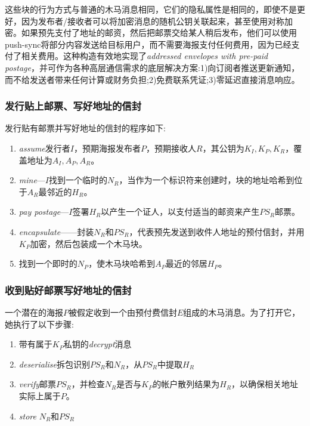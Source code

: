 这些块的行为方式与普通的木马消息相同，它们的隐私属性是相同的，即使不是更好，因为发布者/接收者可以将加密消息的随机公钥关联起来，甚至使用对称加密。如果预先支付了地址的邮资，然后把邮票交给某人稍后发布，他们可以使用push-sync将部分内容发送给目标用户，而不需要海报支付任何费用，因为已经支付了相关费用。这种构造有效地实现了\emph{addressed envelopes with pre-paid postage}，并可作为各种高层通信需求的底层解决方案:1)向订阅者推送更新通知，而不给发送者带来任何计算或财务负担;2)免费联系凭证;3)零延迟直接消息响应。  


\subsubsection{发行贴上邮票、写好地址的信封}

发行贴有邮票并写好地址的信封的程序如下:

\begin{enumerate}
\item \emph{assume}发行者$I$，预期海报发布者$P$，预期接收人$R$，其公钥为$K_I, K_P, K_R$，覆盖地址为$A_I, A_P, A_R$。
\item \emph{mine}—$I$找到一个临时的$N_R$，当作为一个标识符来创建时，块的地址哈希到位于$A_R$最邻近的$H_R$。
\item \emph{pay postage}—$I$签署$H_R$以产生一个证人，以支付适当的邮资来产生$PS_R$邮票。
\item \emph{encapsulate}——封装$N_R$和$PS_R$，代表预先发送到收件人地址的预付信封，并用$K_P$加密，然后包装成一个木马块。
\item 找到一个即时的$N_P$，使木马块哈希到$A_P$最近的邻居$H_P$。 
\end{enumerate}




\subsubsection{收到贴好邮票写好地址的信封}

一个潜在的海报$P$被假定收到一个由预付费信封$E$组成的木马消息。为了打开它，她执行了以下步骤:

\begin{enumerate}
    \item 带有属于$K_P$私钥的\emph{decrypt}消息
    \item \emph{deserialise}拆包识别$PS_R$和$N_R$，从$PS_R$中提取$H_R$
    \item \emph{verify}邮票$PS_R$，并检查$N_R$是否与$K_P$的帐户散列结果为$H_R$，以确保相关地址实际上属于$P$。
    \item \emph{store} $N_R$和$PS_R$ 
\end{enumerate}

